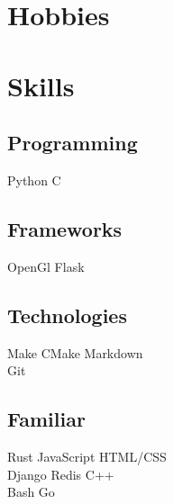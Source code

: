 \documentclass[]{resume-openfont}
\begin{document}
\begin{minipage}[t]{0.33\textwidth}
\section{Hobbies}
\sectionsep

\vspace{-2mm} %

\section{Skills}
\subsection{Programming}
Python \textbullet{} C
\sectionsep
\subsection{Frameworks}
OpenGl \textbullet{} Flask
\sectionsep
\subsection{Technologies}
Make  \textbullet{} CMake \textbullet{} Markdown \\
Git
\sectionsep
\subsection{Familiar}
Rust \textbullet{} JavaScript\textbullet{} HTML/CSS \\
Django \textbullet{} Redis \textbullet{} C++ \\
Bash \textbullet{} Go
\sectionsep

%
%

\end{minipage}
\hfill
\end{document}
